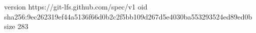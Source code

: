 version https://git-lfs.github.com/spec/v1
oid sha256:9ec262319ef44a5136f66d0b2c2f5bb109d267d5e4030ba553293524ed89ed0b
size 283
